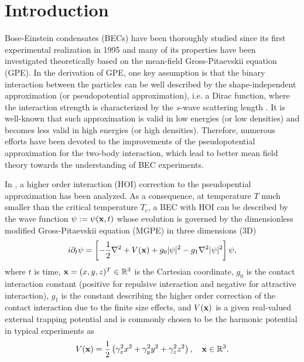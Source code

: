\documentclass{elsarticle}
\newcommand{\be}{\begin{equation}}
\newcommand{\ee}{\end{equation}}
\newcommand{\bx}{{\bf x} }
\begin{document}
\section{Introduction}
\label{s1} \setcounter{equation}{0}
Bose-Einstein condensates (BECs) have been thoroughly studied since its first experimental realization in 1995 \cite{Anderson,Davis} and many of its properties have been investigated theoretically  based on the mean-field  Gross-Pitaevskii equation (GPE).
In the derivation of GPE, one key assumption is
 that the binary interaction between the particles can be
well described by  the shape-independent approximation (or pseudopotential approximation), i.e. a Dirac function, where the interaction strength
is characterized by  the $s$-wave scattering length \cite{Esry}. It is well-known  that such approximation is valid in
low energies (or low densities) and becomes less valid in  high energies (or high densities). Therefore, numerous efforts have been devoted
to the improvements of the pseudopotential approximation for the two-body interaction, which lead to better mean field theory towards the understanding of
BEC experiments.

In \cite{Esry,Collin}, a higher order interaction (HOI) correction to the pseudopential approximation has been analyzed. As a consequence,
at temperature $T$ much smaller than the critical temperature $T_c$, a BEC with HOI   can be described by the
wave function $\psi:=\psi(\bx,t)$
whose evolution is governed by the  dimensionless modified Gross-Pitaevskii equation (MGPE) in  three dimensions (3D) \cite{Ruan,Collin,Esry}
\be\label{eq:mgpe3d}
i\partial_t \psi=\left[-\frac12\nabla^2
+V(\bx)
+ g_{0}|\psi|^2-g_1\nabla^2|\psi|^2\right]\psi,
 \ee
where $t$ is time,
$\bx=(x,y,z)^T\in \mathbb R^3$   is the Cartesian coordinate,
$g_{0}$ is the contact interaction constant (positive for
repulsive interaction and negative for attractive interaction), $g_{1}$ is the constant describing the higher order
correction of the contact interaction due to the finite size effects,
and $V(\bx)$ is a given
real-valued external trapping potential
and is commonly chosen to be the harmonic potential in typical experiments as
\begin{equation}\label{eq:pot}
V(\bx)=\frac{1}{2}\left(\gamma_x^2x^2+\gamma_y^2y^2+\gamma_z^2z^2\right),\quad \bx\in{\mathbb R}^3.
\end{equation}
\end{document}
